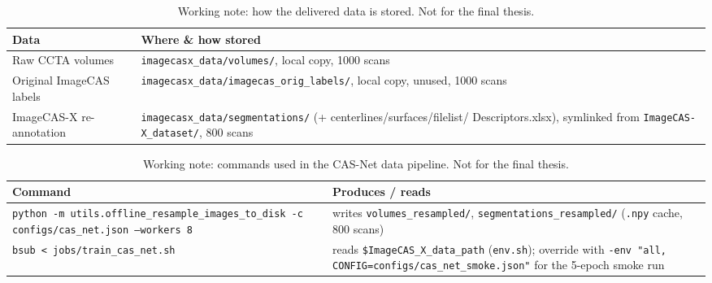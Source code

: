 
\begingroup
\footnotesize
\renewcommand{\arraystretch}{0.85}

\begin{table}[htbp]
  \centering
  \begin{tabularx}{\textwidth}{@{}l X@{}}
    \toprule
    \textbf{Data} & \textbf{Where \& how stored} \\
    \midrule
    Raw CCTA volumes &
      \texttt{imagecasx\_data/volumes/}, local copy, 1000 scans \\
    Original ImageCAS labels &
      \texttt{imagecasx\_data/imagecas\_orig\_labels/}, local copy, unused, 1000 scans \\
    ImageCAS-X re-annotation &
      \texttt{imagecasx\_data/segmentations/} (+ centerlines/surfaces/filelist/
      Descriptors.xlsx), symlinked from \texttt{ImageCAS-X\_dataset/}, 800 scans \\
    \bottomrule
  \end{tabularx}
  \caption{Working note: how the delivered data is stored. Not for the final thesis.}
  \label{tab:data-storage-notes}
\end{table}

\begin{table}[htbp]
  \centering
  \begin{tabularx}{\textwidth}{@{}X X@{}}
    \toprule
    \textbf{Command} & \textbf{Produces / reads} \\
    \midrule
    \texttt{python -m utils.offline\_resample\_\allowbreak images\_to\_disk -c
      configs/cas\_net.json --workers 8} &
      writes \texttt{volumes\_resampled/}, \texttt{segmentations\_resampled/}
      (\texttt{.npy} cache, 800 scans) \\
    \texttt{bsub < jobs/train\_cas\_net.sh} &
      reads \texttt{\$ImageCAS\_X\_data\_path} (\texttt{env.sh}); override with
      \texttt{-env "all, CONFIG=\allowbreak configs/cas\_net\_smoke.json"} for the
      5-epoch smoke run \\
    \bottomrule
  \end{tabularx}
  \caption{Working note: commands used in the CAS-Net data pipeline. Not for the
    final thesis.}
  \label{tab:data-commands-notes}
\end{table}

\endgroup
